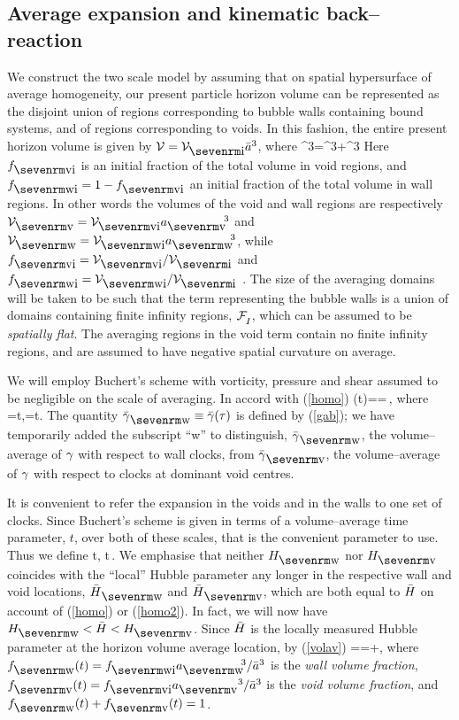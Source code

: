 \documentclass[12pt]{article}
\begin{document}
\subsection{Average expansion and kinematic back--reaction}
We construct the two scale model by assuming that on spatial hypersurface
of average homogeneity, our present particle horizon volume
can be represented as the disjoint union of regions corresponding to bubble
walls containing bound systems, and of regions corresponding to voids. In
this fashion, the entire present horizon volume is given by $\Vav=\Vav\ns i
\ab^3$, where
\beq\ab^3=\fwi\aw^3+\fvi\av^3\label{volav}\eeq
Here $\fvi$ is an initial fraction of the total volume in void regions,
and $\fwi=1-\fvi$ an initial fraction of the total volume in wall regions.
In other words the volumes of the void and wall regions are respectively
$\Vav\ns v=\Vav\ns{vi}\av^3$ and $\Vav\ns w=\Vav\ns{wi}\aw^3$, while
$\fvi=\Vav\ns{vi}/\Vav\ns i$ and $\fwi=\Vav\ns{wi}/\Vav\ns i$ .
The size of the averaging domains will be taken to be such that the
term representing the bubble walls is a union of domains containing finite
infinity regions, $\FF\Z I$, which can be assumed to be {\em spatially flat}.
The averaging regions in the void term contain no finite infinity regions,
and are assumed to have negative spatial curvature on average.

We will employ Buchert's scheme with vorticity, pressure and shear
assumed to be negligible on the scale of averaging. In accord with
(\ref{homo})
\beq\bH(t)==\,,\label{homo2}\eeq
where
\beq\gw=\Deriv\dd\tw t,\qquad{}\qquad\gv=\Deriv\dd\tv t.\label{clocks1}
\eeq
The quantity $\gw\equiv\gb(\tc)$ is defined by (\ref{gab}); we have
temporarily added the subscript ``w'' to distinguish, $\gw$, the
volume--average of $\gamma$ with respect to wall clocks, from $\gv$, the
volume--average of $\gamma$ with respect to clocks at dominant void centres.

It is convenient to refer the expansion in the voids and in the walls
to one set of clocks. Since Buchert's scheme is given in terms of a
volume--average time parameter, $t$, over both of these scales, that is
the convenient parameter to use. Thus we define
\beq\Hw\equiv{1\over\aw}\Deriv\dd t\aw,\qquad{}\qquad
\Hv\equiv{1\over\av}\Deriv\dd t\av\,.\label{homo3}\eeq
We emphasise that neither $\Hw$ nor $\Hv$ coincides with the ``local''
Hubble parameter any longer in the respective wall and void locations,
$\bH\ns{w}$ and $\bH\ns{v}$, which
are both equal to $\bH$ on account of (\ref{homo}) or (\ref{homo2}). In
fact, we will now have $\Hw<\bH<\Hv$. Since $\bH$ is the locally
measured Hubble parameter at the horizon volume average location, by
(\ref{volav})
\beq\bH=\ave\th{}=\fw\Hw+\fv\Hv,\label{Hback}\eeq
where $\fw(t)=\fwi\aw^3/\ab^3$ is the {\em wall volume fraction},
$\fv(t)=\fvi{a\ns v}^3/\ab^3$ is the {\em void volume fraction},
and $f\ns w(t)+\fv(t)=1$.
\end{document}
